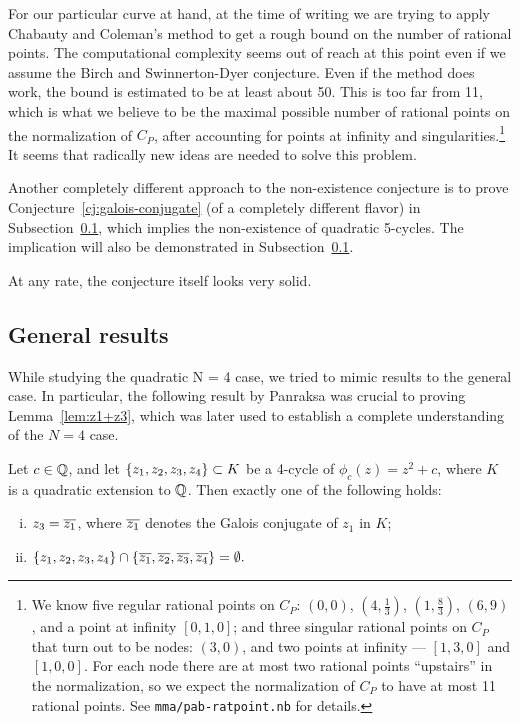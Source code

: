 For our particular curve at hand, at the time of writing we are trying
to apply Chabauty and Coleman's method to get a rough bound on the
number of rational points. The computational complexity seems out of
reach at this point even if we assume the Birch and Swinnerton-Dyer
conjecture. Even if the method does work, the bound is estimated to be
at least about 50. This is too far from 11, which is what we believe
to be the maximal possible number of rational points on the
normalization of $C_P$, after accounting for points at infinity and
singularities.\footnote{%
  We know five regular rational points on $C_P$: $(0, 0)$, $(4,
  \frac{1}{3})$, $(1, \frac{8}{3})$, $(6, 9)$, and a point at infinity
  $[0, 1, 0]$; and three singular rational points on $C_P$ that turn
  out to be nodes: $(3, 0)$, and two points at infinity --- $[1, 3,
  0]$ and $[1, 0, 0]$. For each node there are at most two rational
  points ``upstairs'' in the normalization, so we expect the
  normalization of $C_P$ to have at most 11 rational points. See
  \texttt{mma/pab-ratpoint.nb} for details.}
It seems that radically new ideas are needed to solve this problem.

Another completely different approach to the non-existence conjecture
is to prove Conjecture~\ref{cj:galois-conjugate} (of a completely
different flavor) in Subsection~\ref{subsec:general}, which implies
the non-existence of quadratic 5-cycles. The implication will also be
demonstrated in Subsection~\ref{subsec:general}.

At any rate, the conjecture itself looks very solid.

\subsection{General results}
\label{subsec:general}

While studying the quadratic N = 4 case, we tried to mimic results to
the general case. In particular, the following result by Panraksa was
crucial to proving Lemma~\ref{lem:z1+z3}, which was later used to
establish a complete understanding of the $N = 4$ case.

\begin{lemma} 
  Let $c \in \mathbb{Q}$, and let $\left\{z_1, z_2, z_3, z_4\right\} \subset K$ be a
  4-cycle of $\phi_c(z) = z^2 + c$, where $K$ is a quadratic extension
  to $\mathbb{Q}$. Then exactly one of the following holds:
  \begin{enumerate}[(i)]
  \item $z_3 = \overline{z_1}$, where $\overline{z_1}$ denotes the Galois
    conjugate of $z_1$ in $K$;

  \item $\{z_1, z_2, z_3, z_4\} \cap \{\overline{z_1}, \overline{z_2}, \overline{z_3},
    \overline{z_4}\} =\emptyset.$
  \end{enumerate}
\end{lemma}

